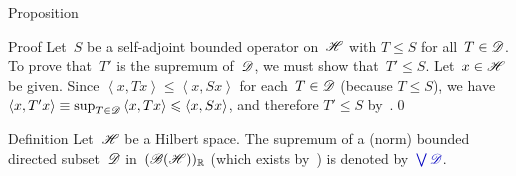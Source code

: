 \documentclass[a]{subfiles}
\begin{document}
\begin{parsec}
\begin{point}{Proposition}
\begin{point}{Proof}
Let~$S$ be a self-adjoint bounded operator on~$\mathscr{H}$ with $T\leq S$
for all~$T\in\mathscr{D}$.
To prove that~$T'$ is the supremum of~$\mathscr{D}$,
we must show that~$T'\leq S$.
Let~$x\in \mathscr{H}$ be given.
Since $\left<x,Tx\right>\leq \left<x,Sx\right>$
for each~$T\in \mathscr{D}$ (because $T\leq S$),
we have $\left<x,T'x\right>\equiv \sup_{T\in\mathscr{D}} \left<x,Tx\right>
\leqslant \left<x,Sx\right>$,
and therefore $T'\leq S$ by~.\qed
\end{point}
\end{point}
\begin{point}{Definition}%
Let~$\mathscr{H}$ be a Hilbert space.
The supremum of a (norm) bounded directed subset~$\mathscr{D}$ 
in~$(\mathscr{B}(\mathscr{H}))_{\mathbb{R}}$
(which exists by~)
is denoted by~$\Define{\bigvee\scrD}$.%
\end{point}
\end{parsec}
\end{document}
